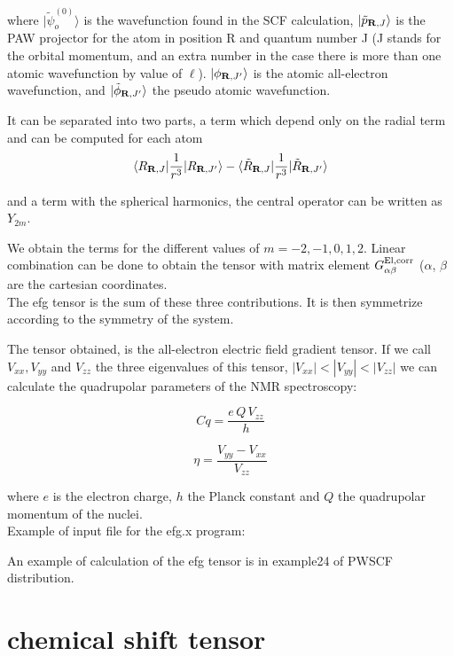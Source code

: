 \documentclass[11pt, a4paper]{article}
\begin{document}
where $|\tilde{\psi}_o^{(0)}\rangle$ is the wavefunction found in the
SCF calculation, $|\tilde{p}_{{\bf R},J} \rangle$ is the PAW projector
for the atom in position R and quantum number J (J stands for the
orbital momentum, and an extra number in the case there is more than
one atomic wavefunction by value of $\ell$). $|\phi_{{\bf
R},J^{\prime}} \rangle$ is the atomic all-electron wavefunction, and
$|\tilde{\phi}_{{\bf R},J^{\prime}} \rangle$ the pseudo atomic
wavefunction.

It can be separated into two parts, a term which depend only on the
radial term and can be computed for each atom
\begin{equation}
\langle R_{{\bf R},J}|\frac{1}{r^3}|R_{{\bf R},J'} \rangle -\langle
\tilde R_{{\bf R},J}|\frac{1}{r^3}|\tilde R_{{\bf R},J'} \rangle
\end{equation}

and a term with the spherical harmonics, the central operator can be
written as $Y_{2m}$.

We obtain the terms for the different values of $m= -2, -1, 0, 1,
2$. Linear combination can be done to obtain the tensor with matrix
element $G_{\alpha\beta}^{{\rm El},{\rm corr}}$ ($\alpha$, $\beta$ are
the cartesian coordinates.\\


The efg tensor is the sum of these three contributions. It is then
symmetrize according to the symmetry of the system.

The tensor obtained, is the all-electron electric field gradient
tensor. If we call $V_{xx}, V_{yy}$ and $V_{zz}$ the three eigenvalues
of this tensor, $|V_{xx}|<|V_{yy}|<|V_{zz}|$ we can calculate the
quadrupolar parameters of the NMR spectroscopy:

 $$ Cq = \frac{e\,Q\,V_{zz}}{h} $$
 
 $$ \eta=\frac{V_{yy}-V_{xx}}{V_{zz}} $$

where $e$ is the electron charge, $h$ the Planck constant and $Q$ the
quadrupolar momentum of the nuclei.\\

Example of input file for the efg.x program:


An example of calculation of the efg tensor is in example24 of PWSCF
distribution.

\section{chemical shift tensor}
\end{document}
